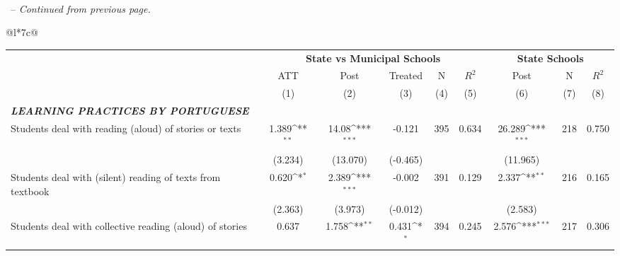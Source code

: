 \documentclass[a4paper, 12pt]{article}
\newcommand{\sym}[1]{\rlap{#1}}%
\begin{document}
\vspace{70pt}
\tablename\ \addtocounter{table}{-1} \thetable\ -- \textit{Continued from previous page.}
\vspace{-10pt}
\begin{longtable}{@{\extracolsep{1pt}}l*{7}{c}@{}} 
\def\sym#1{\ifmmode^{#1}\else\(^{#1}\)\fi}
\begin{adjustbox}{max width=\textwidth}           
\begin{tabular}{l*{8}{c}}
\toprule
&\multicolumn{5}{c}{\textbf{State vs Municipal Schools}}  &            \multicolumn{3}{c}{\textbf{State Schools}} \\ \cline{2-6}              \cline{7-9} 
&\multicolumn{1}{c}{ATT}&\multicolumn{1}{c}{Post}&\multicolumn{1}{c}{Treated}&\multicolumn{1}{c}{N}&\multicolumn{1}{c}{$R^2$} &\multicolumn{1}{c}{Post}&\multicolumn{1}{c}{N}&\multicolumn{1}{c}{$R^2$} \\
\cline{2-2}                    \cline{3-3}                    \cline{4-4}            \cline{5-5}                    \cline{6-6}                    \cline{7-7}                    \cline{8-8}                    \cline{9-9}                    
                    &         (1)   &         (2)   &         (3)   &         (4)   &         (5)   &         (6)  &         (7)  &         (8)   \\
\midrule
\textbf{\emph{LEARNING PRACTICES BY PORTUGUESE}}&            &            &            &                     &               \\
Students deal with reading (aloud) of stories or texts    &       1.389\sym{**} &       14.08\sym{***}&      -0.121         &       395  &     0.634      &       26.289\sym{***}         &       218        &        0.750   \\
            &     (3.234)         &     (13.070)         &     (-0.465)         &              &       &     (11.965)                 \\
Students deal with (silent) reading of texts from textbook      &       0.620\sym{*}  &       2.389\sym{***}&    -0.002         &  391    &    0.129 &       2.337\sym{**}         &       216        &    0.165    \\
            &     (2.363)         &     (3.973)         &     (-0.012)         &             &     &     (2.583)                   \\
Students deal with collective reading (aloud) of stories     &       0.637         &       1.758\sym{**} &       0.431\sym{*}  &     394         &     0.245      &       2.576\sym{***}         &       217        &        0.306   \\

\end{tabular}
\end{adjustbox}
\end{longtable}
\end{document}
